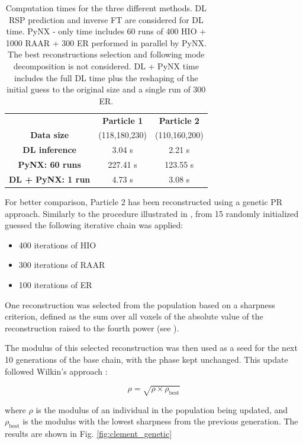\begin{table}[H]
    \centering
    \begin{tabular}{ccc}
         & \textbf{Particle 1} & \textbf{Particle 2} \\
        \textbf{Data size} & (118,180,230) & (110,160,200) \\
        \textbf{DL inference} & 3.04 s & 2.21 s \\
        \textbf{PyNX: 60 runs} & 227.41 s & 123.55 s \\
        \textbf{DL + PyNX: 1 run} &  4.73 s & 3.08 s \\
    \end{tabular}
    \caption{Computation times for the three different methods. DL RSP prediction and inverse FT are considered for 
    DL time. PyNX - only time includes 60 runs of 400 HIO + 1000 RAAR + 300 ER performed in parallel by PyNX. The best 
    reconstructions selection and following mode decomposition is not considered. DL + PyNX time includes 
    the full DL time plus the reshaping of the initial guess to the original size and a single run of 300 ER. }
    \label{tab:times}
\end{table}

For better comparison, Particle 2 has been reconstructed using a genetic PR approach. Similarly to the procedure illustrated 
in \cite{Ulvestad2017}, from 15 randomly initialized guessed the following iterative chain was applied:
\begin{itemize}
    \item 400 iterations of HIO
    \item 300 iterations of RAAR
    \item 100 iterations of ER
\end{itemize}

One reconstruction was selected from the population based on a sharpness criterion, defined as the sum over all voxels 
of the absolute value of the reconstruction raised to the fourth power (see \cite{Ulvestad2017}).
    
The modulus of this selected reconstruction was then used as a seed for the next 10 generations of the base chain, 
with the phase kept unchanged. This update followed Wilkin's approach \cite{WilkinGenetic_2021}:

\begin{equation}
\rho = \sqrt{\rho \times \rho_{\text{best}}}
\end{equation}

where $\rho$ is the modulus of an individual in the population being updated, and $\rho_{\text{best}}$ is the 
modulus with the lowest sharpness from the previous generation.
The results are shown in Fig. \ref{fig:clement_genetic}

